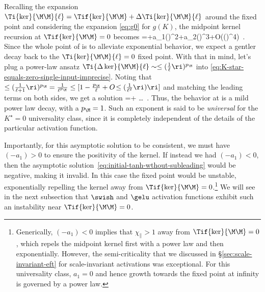 Recalling the expansion  $\Ti{ \ker}{\M\M}{\ell}=\Tif{\ker}{\M\M}+\Delta\Ti{ \ker}{\M\M}{\ell}$ around the fixed point and considering the expansion \eqref{eq:g0} for $g(K)$, the  midpoint kernel recursion at $\Tif{ \ker}{\M\M}=0$  becomes
\be\label{eq:K-star-equals-zero-single-input-imprecise}
=\Ti{ \Delta\ker}{\M\M}{\ell}+a_1\le(\Ti{ \Delta\ker}{\M\M}{\ell}\ri)^2+a_2\le(\Ti{\Delta \ker}{\M\M}{\ell}\ri)^3+O\!\le(\le(\Ti{ \Delta\ker}{\M\M}{\ell}\ri)^4\ri)\, .
\ee
Since the whole point of  is to alleviate exponential behavior, we expect a gentler decay back to the $\Ti{ \ker}{\M\M}{\ell}=0$ fixed point. 
With that in mind, let's plug a power-law ansatz $\Ti{\Delta\ker}{\M\M}{\ell}\sim\le(\frac{1}{\ell}\ri)^{p_\M}$ into \eqref{eq:K-star-equals-zero-single-input-imprecise}. Noting that $\le(\frac{1}{\ell+1}\ri)^{p_\M}=\frac{1}{\ell^{p_\M}}\le[1-\frac{p_\M}{\ell}+O\!\le(\frac{1}{\ell^2}\ri)\ri]$ and matching the leading terms on both sides, we get a solution 
\be\label{eq:initial-tanh-wthout-subleading}
\Ti{\Delta\ker}{\M\M}{\ell}=\le[\frac{1}{(-a_1)}\ri]+ \ldots \, .%
\ee
Thus, the behavior at  is a mild power law decay, with a  $p_\M=1$. Such an exponent is said to be \emph{universal} for the $K^\star=0$ universality class, since it is completely independent of the details of the particular activation function.

Importantly, for this asymptotic solution to be consistent, we must have $(-a_1)>0$ to ensure the positivity of the kernel. If instead we had $(-a_1) <0$, then the asymptotic solution~\eqref{eq:initial-tanh-wthout-subleading} would be negative, making it invalid. In this case the fixed point would be unstable, exponentially repelling the kernel away from $\Tif{ \ker}{\M\M}=0$.\footnote{Generically, $(-a_1)<0$ implies that $\chi_{\parallel}>1$ away from $\Tif{ \ker}{\M\M}=0$,
which repels the midpoint kernel first with a power law and then exponentially. However, the semi-criticality that we discussed in \S\ref{sec:scale-invariant-eft} for scale-invariant activations was exceptional. For this universality class, $a_1=0$ and hence growth towards the fixed point at infinity is governed by a power law.} 
We will see in the next subsection that 
$\swish$ and $\gelu$ activation functions exhibit such an instability near $\Tif{ \ker}{\M\M}=0$.

